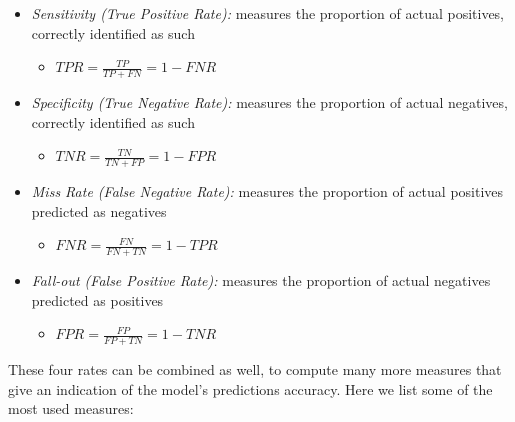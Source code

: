 \begin{itemize}
	\item \textsl{Sensitivity (True Positive Rate):} measures the proportion of actual positives, correctly identified as such
	\begin{itemize}
		\item[] $TPR = \frac{TP}{TP+FN} = 1-FNR$
	\end{itemize}
	\item \textsl{Specificity (True Negative Rate):} measures the proportion of actual negatives, correctly identified as such
	\begin{itemize}
		\item[] $TNR = \frac{TN}{TN+FP} = 1-FPR$
	\end{itemize}
	\item \textsl{Miss Rate (False Negative Rate):} measures the proportion of actual positives predicted as negatives
	\begin{itemize}
		\item[] $FNR = \frac{FN}{FN+TN} = 1-TPR$
	\end{itemize}
	\item \textsl{Fall-out (False Positive Rate):} measures the proportion of actual negatives predicted as positives
	\begin{itemize}
		\item[] $FPR = \frac{FP}{FP+TN} = 1-TNR$
	\end{itemize}
\end{itemize}

These four rates can be combined as well, to compute many more measures that give an indication of the model's predictions accuracy. Here we list some of the most used measures:

